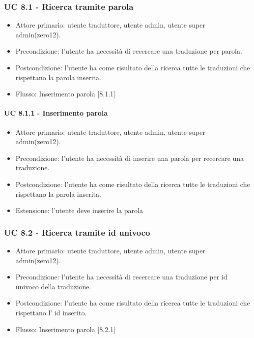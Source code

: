     \subsubsection{UC 8.1 - Ricerca tramite parola}
        \begin{itemize}
            \item Attore primario: utente traduttore, utente admin, utente super admin(zero12).
            \item Precondizione: l'utente ha necessità di recercare una traduzione per parola.
            \item Postcondizione: l'utente ha come risultato della ricerca tutte le traduzioni che rispettano la parola inserita.
            \item Flusso: Inserimento parola [8.1.1]
        \end{itemize}
        \paragraph{UC 8.1.1 - Inserimento parola}
            \begin{itemize}
                \item Attore primario: utente traduttore, utente admin, utente super admin(zero12).
                \item Precondizione: l'utente ha necessità di inserire una parola per recercare una traduzione.
                \item Postcondizione: l'utente ha come risultato della ricerca tutte le traduzioni che rispettano la parola inserita.
                \item Estensione: l'utente deve inserire la parola
            \end{itemize}
    \subsubsection{UC 8.2 - Ricerca tramite id univoco}
        \begin{itemize}
            \item Attore primario: utente traduttore, utente admin, utente super admin(zero12).
            \item Precondizione: l'utente ha necessità di recercare una traduzione per id univoco della traduzione.
            \item Postcondizione: l'utente ha come risultato della ricerca tutte le traduzioni che rispettano l' id inserito.
            \item Flusso: Inserimento parola [8.2.1]
        \end{itemize}
